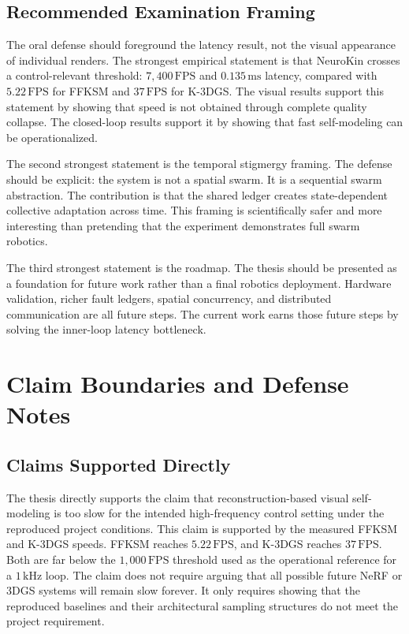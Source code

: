 \documentclass[12pt,a4paper,oneside]{report}
\begin{document}
\section{Recommended Examination Framing}

The oral defense should foreground the latency result, not the visual appearance of individual renders. The strongest empirical statement is that NeuroKin crosses a control-relevant threshold: $7{,}400\,\mathrm{FPS}$ and $0.135\,\mathrm{ms}$ latency, compared with $5.22\,\mathrm{FPS}$ for FFKSM and $37\,\mathrm{FPS}$ for K-3DGS. The visual results support this statement by showing that speed is not obtained through complete quality collapse. The closed-loop results support it by showing that fast self-modeling can be operationalized.

The second strongest statement is the temporal stigmergy framing. The defense should be explicit: the system is not a spatial swarm. It is a sequential swarm abstraction. The contribution is that the shared ledger creates state-dependent collective adaptation across time. This framing is scientifically safer and more interesting than pretending that the experiment demonstrates full swarm robotics.

The third strongest statement is the roadmap. The thesis should be presented as a foundation for future work rather than a final robotics deployment. Hardware validation, richer fault ledgers, spatial concurrency, and distributed communication are all future steps. The current work earns those future steps by solving the inner-loop latency bottleneck.

\chapter{Claim Boundaries and Defense Notes}

\section{Claims Supported Directly}

The thesis directly supports the claim that reconstruction-based visual self-modeling is too slow for the intended high-frequency control setting under the reproduced project conditions. This claim is supported by the measured FFKSM and K-3DGS speeds. FFKSM reaches $5.22\,\mathrm{FPS}$, and K-3DGS reaches $37\,\mathrm{FPS}$. Both are far below the $1{,}000\,\mathrm{FPS}$ threshold used as the operational reference for a $1\,\mathrm{kHz}$ loop. The claim does not require arguing that all possible future NeRF or 3DGS systems will remain slow forever. It only requires showing that the reproduced baselines and their architectural sampling structures do not meet the project requirement.
\end{document}
